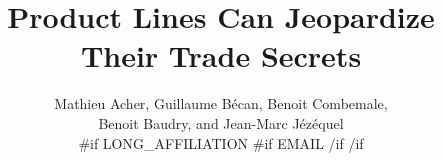 \documentclass{sig-alternate}
\begin{document}
%

\title{Product Lines Can Jeopardize Their Trade Secrets}
%
%
%
%
%

%
\author{
%
%
\alignauthor
Mathieu Acher, Guillaume B\'{e}can, Benoit Combemale,\\ Benoit Baudry, and Jean-Marc J\'{e}z\'{e}quel\\
        {{#if LONG_AFFILIATION}}
        {{#if EMAIL}}
        {{/if}}
        {{/if}}
}
\end{document}
